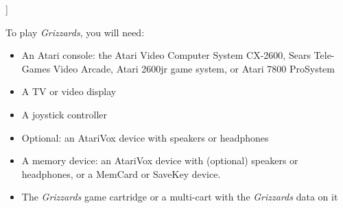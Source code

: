 \documentclass[10pt,twocolumn,openany,article]{memoir}
\begin{document}
]

\let\cleardoublepage\clearpage

\mainmatter

\tableofcontents


To play \textit{Grizzards}, you will need:

\begin{itemize}
\item An Atari  console: the Atari Video Computer  System CX-2600, Sears
  Tele-Games  Video Arcade,  Atari  2600jr game  system,  or Atari  7800
  ProSystem
\item A TV or video display
\item A joystick controller
  \ifdefined\ATARIAGESAVE
  \item Optional: an AtariVox device with speakers or headphones
  \else
  \ifdefined\NOSAVE\else
\item A  memory device: an  AtariVox device with (optional)  speakers or
  headphones, or a MemCard or SaveKey device.
  \fi\fi
\item The \textit{Grizzards} game cartridge \ifdefined\ATARIAGESAVE\else
  or a multi-cart with the \textit{Grizzards} data on it \fi
\end{itemize}
\end{document}

